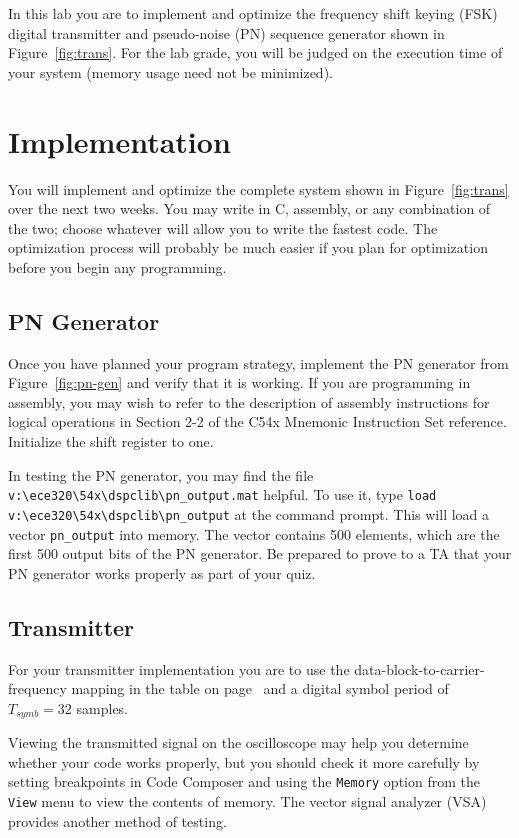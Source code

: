 In this lab you are to implement and optimize
the frequency shift keying (FSK) digital transmitter
and pseudo-noise (PN) sequence generator shown in Figure~\ref{fig:trans}.
For the lab grade, you will
be judged on the execution time of your system (memory usage need not
be minimized).

\section{Implementation}
You will implement and optimize the complete system shown in
Figure~\ref{fig:trans}
over the next two weeks.  You may write in C, assembly, or 
any combination of the two; choose whatever will allow you to 
write the fastest code.  The optimization process will probably 
be much easier if you plan for optimization before you begin 
any programming.

\subsection{PN Generator}
Once you have planned your program strategy, implement the PN 
generator from Figure~\ref{fig:pn-gen} and verify that it is working.  
If you are programming in assembly, you may wish to refer 
to the description of assembly instructions for logical operations
in Section 2-2 of the C54x Mnemonic Instruction Set reference.  
Initialize the shift register to one.  

In testing the PN generator, you may find the file 
\verb+v:\ece320\54x\dspclib\pn_output.mat+ helpful.  
To use it, type \verb+load v:\ece320\54x\dspclib\pn_output+
at the \matlab command prompt.  This will load a vector 
\verb+pn_output+ into memory.  The vector contains 500 elements, 
which are the first 500 output bits of the PN generator.
Be prepared to prove to
a TA that your PN generator works properly as part of your quiz.

\subsection{Transmitter}
For your transmitter implementation you are to use
the data-block-to-carrier-frequency mapping in the table 
on page~\pageref{table}
and a digital symbol period of $T_{symb} = 32$ samples.  

Viewing the transmitted signal on the oscilloscope may help 
you determine whether your code works properly, but you should 
check it more carefully by setting breakpoints in Code Composer and 
using the \verb+Memory+ option from the \verb+View+ menu to view 
the contents of memory.  The vector signal analyzer (VSA) provides 
another method of testing. 

